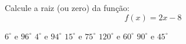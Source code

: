 Calcule a raiz (ou zero) da função:
\[f(x)=2x-8\]

$6^\circ$ e $96^\circ$
$4^\circ$ e $94^\circ$
$15^\circ$ e $75^\circ$
$120^\circ$ e $60^\circ$
$90^\circ$ e $45^\circ$




